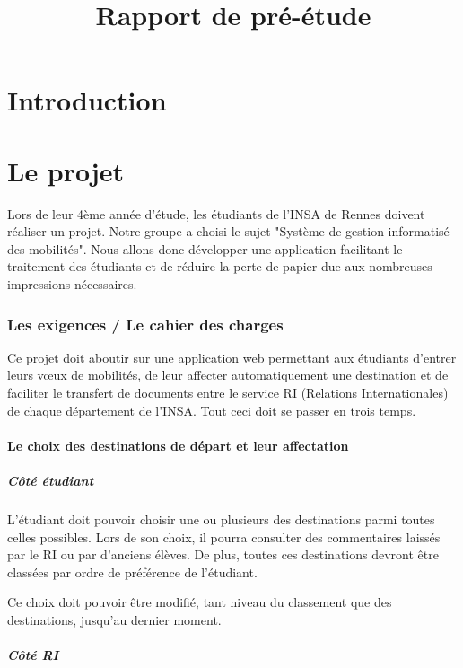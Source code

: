 \documentclass{rapport}
\title{Rapport de pré-étude}
\begin{document}
	
	
	\tableofcontents	
	\part{Introduction}
	
	
	\part{Le projet}
	 Lors de leur 4ème année d'étude, les étudiants de l'INSA de Rennes doivent réaliser un projet. Notre groupe a choisi le sujet "Système de gestion informatisé des mobilités". Nous allons donc développer une application facilitant le traitement des étudiants et de réduire la perte de papier due aux nombreuses impressions nécessaires.
		
		\section{Les exigences / Le cahier des charges}
		
		Ce projet doit aboutir sur une application web permettant aux étudiants d'entrer leurs vœux de mobilités, de leur affecter automatiquement une destination et de faciliter le transfert de documents entre le service RI (Relations Internationales) de chaque département de l'INSA. Tout ceci doit se passer en trois temps.
		
		 \subsection{Le choix des destinations de départ et leur affectation}
		 
		 \subsubsection{Côté étudiant}
		 
		 L'étudiant doit pouvoir choisir une ou plusieurs des destinations parmi toutes celles possibles. Lors de son choix, il pourra consulter des commentaires laissés par le RI ou par d'anciens élèves. De plus, toutes ces destinations devront être classées par ordre de préférence de l'étudiant.
		 
		 Ce choix doit pouvoir être modifié, tant niveau du classement que des destinations, jusqu'au dernier moment.
		 
		\subsubsection{Côté RI}
		
\end{document}
